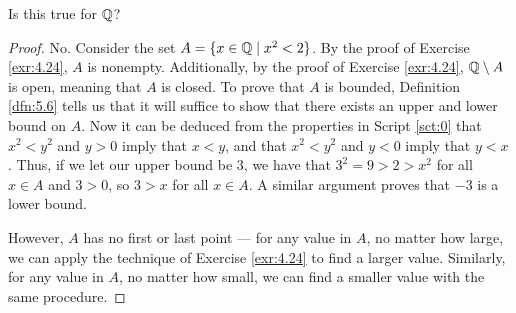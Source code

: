 \documentclass[../main.tex]{subfiles}
\begin{document}
\begin{exercise}\label{exr:5.19}
    Is this true for $\mathbb{Q}$?
    \begin{proof}
        No. Consider the set $A=\{x\in\mathbb{Q}\mid x^2<2\}$. By the proof of Exercise \ref{exr:4.24}, $A$ is nonempty. Additionally, by the proof of Exercise \ref{exr:4.24}, $\mathbb{Q}\setminus A$ is open, meaning that $A$ is closed. To prove that $A$ is bounded, Definition \ref{dfn:5.6} tells us that it will suffice to show that there exists an upper and lower bound on $A$. Now it can be deduced from the properties in Script \ref{sct:0} that $x^2<y^2$ and $y>0$ imply that $x<y$, and that $x^2<y^2$ and $y<0$ imply that $y<x$. Thus, if we let our upper bound be 3, we have that $3^2=9>2>x^2$ for all $x\in A$ and $3>0$, so $3>x$ for all $x\in A$. A similar argument proves that $-3$ is a lower bound.\par
        However, $A$ has no first or last point --- for any value in $A$, no matter how large, we can apply the technique of Exercise \ref{exr:4.24} to find a larger value. Similarly, for any value in $A$, no matter how small, we can find a smaller value with the same procedure.
    \end{proof}
\end{exercise}
\end{document}
